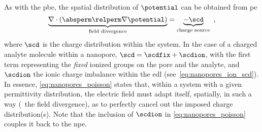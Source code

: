 As with the \gls{pbe}, the spatial distribution of $\potential$ can be obtained from \gls{pe}
%
\begin{equation}\label{eq:nanopores_poisson}
  \underbrace { \nabla \cdot \left(\absperm \relperm \nabla \potential \right) }_{\text{field divergence}}
  = \underbrace{ - \scd }_{\text{charge source}}
  \text{ ,}
\end{equation}
%
where $\scd$ is the charge distribution within the system. In the case of a charged analyte molecule within a
nanopore, $\scd = \scdfix + \scdion$, with the first term representing the \emph{fixed} ionized groups on the
pore and the analyte, and $\scdion$ the ionic charge imbalance within the \gls{edl}
(see~\cref{eq:nanopores_ion_scd}). In essence, \cref{eq:nanopores_poisson} states that, within a system with a
given permittivity distribution, the electric field must adapt itself, spatially, in such a way (\ie~the field
divergence), as to perfectly cancel out the imposed charge distribution(s). Note that the inclusion of
$\scdion$ in \cref{eq:nanopores_poisson} couples it back to the \gls{npe}.

